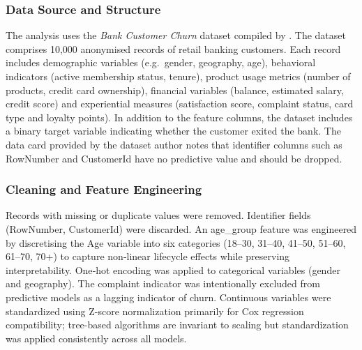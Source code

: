\documentclass[12pt]{article}
\begin{document}
\subsubsection{Data Source and Structure}
The analysis uses the \emph{Bank Customer Churn} dataset compiled by \citet{kollipara2022bank}.  The dataset comprises 10,000 anonymised records of retail banking customers.  Each record includes demographic variables (e.g.\ gender, geography, age), behavioral indicators (active membership status, tenure), product usage metrics (number of products, credit card ownership), financial variables (balance, estimated salary, credit score) and experiential measures (satisfaction score, complaint status, card type and loyalty points).  In addition to the feature columns, the dataset includes a binary target variable indicating whether the customer exited the bank.  The data card provided by the dataset author notes that identifier columns such as RowNumber and CustomerId have no predictive value and should be dropped.

\subsubsection{Cleaning and Feature Engineering}
Records with missing or duplicate values were removed. Identifier fields (RowNumber, CustomerId) were discarded. An age\_group feature was engineered by discretising the Age variable into six categories (18–30, 31–40, 41–50, 51–60, 61–70, 70+) to capture non‑linear lifecycle effects while preserving interpretability. One‑hot encoding was applied to categorical variables (gender and geography). The complaint indicator was intentionally excluded from predictive models as a lagging indicator of churn. Continuous variables were standardized using Z-score normalization primarily for Cox regression compatibility; tree-based algorithms are invariant to scaling but standardization was applied consistently across all models.
\end{document}
